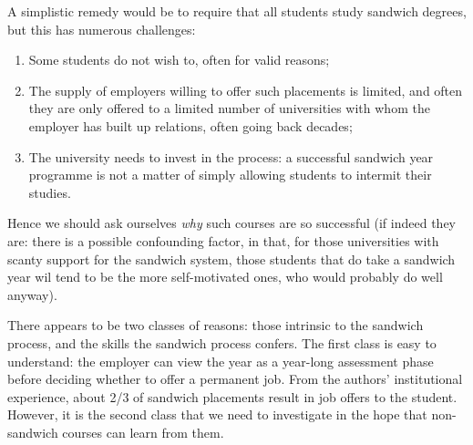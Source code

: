\documentclass[sigconf,anonymous]{acmart}
\begin{document}
A simplistic remedy would be to require that all students study
sandwich degrees, but this has numerous challenges:

\begin{enumerate}
\item Some students do not wish to, often for valid reasons;
\item The supply of employers willing to offer such placements is
limited, and often they are only offered to a limited number of
universities with whom the employer has built up relations, often
going back decades;
\item The university needs to invest in the process: a successful
sandwich year programme is not a matter of simply allowing students to
intermit their studies.
\end{enumerate}

Hence we should ask ourselves \emph{why} such courses are so
successful (if indeed they are: there is a possible confounding
factor, in that, for those universities with scanty support for the
sandwich system, those students that do take a sandwich year wil tend
to be the more self-motivated ones, who would probably do well
anyway).

There appears to be two classes of reasons: those intrinsic to the
sandwich process, and the skills the sandwich process confers. The
first class is easy to understand: the employer can view the year as a
year-long assessment phase before deciding whether to offer a
permanent job. From the authors' institutional experience, about 2/3
of sandwich placements result in job offers to the student. However,
it is the second class that we need to investigate in the hope that
non-sandwich courses can learn from them. 


\end{document}
